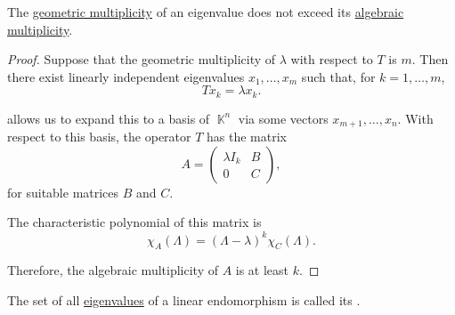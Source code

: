 \begin{proposition}\label{thm:geometric_vs_algebraic_multiplicity}
  The \hyperref[def:eigenpair_multiplicity]{geometric multiplicity} of an eigenvalue does not exceed its \hyperref[def:eigenpair_multiplicity]{algebraic multiplicity}.
\end{proposition}
\begin{proof}
  Suppose that the geometric multiplicity of \( \lambda \) with respect to \( T \) is \( m \). Then there exist linearly independent eigenvalues \( x_1, \ldots, x_m \) such that, for \( k = 1, \ldots, m \),
  \begin{equation*}
    T x_k = \lambda x_k.
  \end{equation*}

   allows us to expand this to a basis of \( \BbbK^n \) via some vectors \( x_{m+1}, \ldots, x_n \). With respect to this basis, the operator \( T \) has the matrix
  \begin{equation*}
    A = \begin{pmatrix}
      \lambda I_k & B \\
      0           & C
    \end{pmatrix},
  \end{equation*}
  for suitable matrices \( B \) and \( C \).

  The characteristic polynomial of this matrix is
  \begin{equation*}
    \chi_A(\Lambda) = (\Lambda - \lambda)^k \chi_C(\Lambda).
  \end{equation*}

  Therefore, the algebraic multiplicity of \( A \) is at least \( k \).
\end{proof}

\begin{definition}\label{def:point_spectrum}
  The set of all \hyperref[def:eigenpair]{eigenvalues} of a linear endomorphism is called its .
\end{definition}

